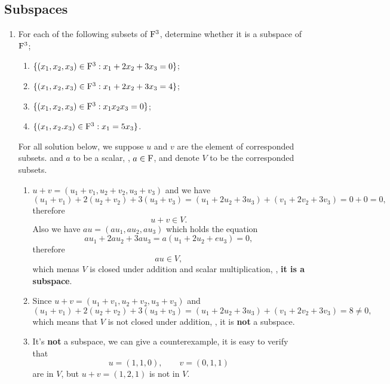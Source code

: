 \subsection{Subspaces}

\begin{enumerate}
    \item For each of the following subsets of $\mathrm{F}^3$, determine whether it is a subspace of $\mathrm{F}^3$;
        \begin{enumerate}[label=(\alph*)]
            \item $\{(x_1, x_2, x_3) \in \mathrm{F}^3: x_1 + 2x_2 + 3x_3 = 0\}$;
            \item $\{(x_1, x_2, x_3) \in \mathrm{F}^3: x_1 + 2x_2 + 3x_3 = 4\}$;
            \item $\{(x_1, x_2, x_3) \in \mathrm{F}^3: x_1x_2x_3=0\}$;
            \item $\{(x_1, x_2. x_3) \in \mathrm{F}^3: x_1 = 5x_3\}$.
        \end{enumerate}
        \begin{solution}
            For all solution below, we suppose $u$ and $v$ are the element of corresponded subsets. and $a$ to be a scalar, \ie, $a \in \mathrm{F}$,
            and denote $V$ to be the corresponded subsets.
            \begin{enumerate}[label=(\alph*)]
                \item $u + v = (u_1+v_1, u_2+v_2, u_3+v_3)$ and we have 
                    \[
                        (u_1+v_1) + 2(u_2+v_2) + 3(u_3+v_3) = (u_1+2u_2+3u_3) + (v_1+2v_2+3v_3) = 0 + 0 = 0,
                    \]
                    therefore 
                    \[ u + v \in V.\]
                    Also we have $au = (au_1, au_2, au_3)$ which holds the equation 
                    \[ au_1 + 2au_2 + 3au_3 = a(u_1+2u_2+eu_3) = 0,\]
                    therefore 
                    \[ au \in V ,\]
                    which menas $V$ is closed under addition and scalar multiplication, \ie, \textbf{it is a subspace}.
                \item Since $u + v = (u_1+v_1, u_2+v_2, u_3+v_3)$ and 
                    \[ (u_1+v_1) + 2(u_2+v_2) + 3(u_3+v_3) = (u_1+2u_2+3u_3) + (v_1+2v_2+3v_3) = 8 \neq 0,\]
                    which means that $V$ is not closed under addition, \ie, it is \textbf{not} a subspace.
                \item It's \textbf{not} a subspace, we can give a counterexample, it is easy to verify that 
                    \[ u=(1,1,0), \qquad v = (0,1,1) \]
                    are in $V$, but $u + v = (1,2,1)$ is not in $V$.

\end{enumerate}
\end{solution}
\end{enumerate}

